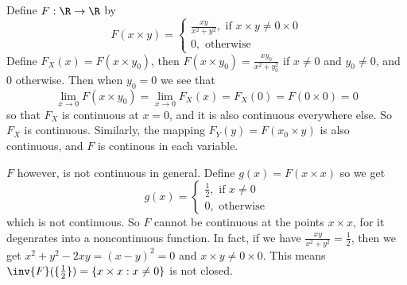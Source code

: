 \begin{example}\label{1.25}
    Define $F:\R \rightarrow \R$ by
    \begin{equation*}
        F(x \times y)=\begin{cases}
                    \frac{xy}{x^2+y^2}, \text{ if } x \times y \neq 0 \times 0 \\
                    0, \text{ otherwise}
                \end{cases}
    \end{equation*}
    Define $F_X(x)=F(x \times y_0)$, then $F(x \times
    y_0)=\frac{xy_0}{x^2+y_0^2}$ if $x \neq 0$ and  $y_0 \neq 0$, and $0$
    otherwise. Then when $y_0=0$ we see that
    \begin{equation*}
        \lim_{x \rightarrow 0}{F(x \times y_0)}=\lim_{x \rightarrow 0}{F_X(x)}
        =F_X(0)=F(0 \times 0)=0
    \end{equation*}
    so that $F_X$ is continuous at  $x=0$, and it is also continuous everywhere
    else. So  $F_X$ is continuous. Similarly, the mapping  $F_Y(y)=F(x_0 \times
    y)$ is also continuous, and $F$ is continous in each variable.

     $F$ however, is not continuous in general. Define  $g(x)=F(x \times x)$ so
     we get
     \begin{equation*}
         g(x)=\begin{cases}
                \frac{1}{2}, \text{ if } x \neq 0 \\
                0, \text{ otherwise}
            \end{cases}
     \end{equation*}
     which is not continuous. So $F$ cannot be continuous at the points  $x
     \times x$, for it degenrates into a noncontinuous function. In fact, if we
     have $\frac{xy}{x^2+y^2}=\frac{1}{2}$, then we get $x^2+y^2-2xy=(x-y)^2=0$
     and $x \times y \neq 0 \times 0$. This means $\inv{F}(\{\frac{1}{2}\})=\{x
     \times x : x \neq 0\}$ is not closed.
\end{example}
